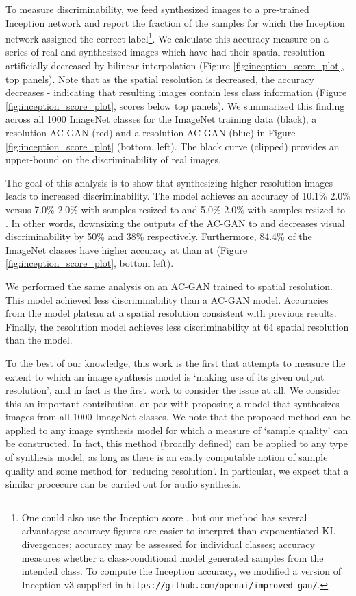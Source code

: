 \documentclass{article}
\begin{document}
To measure discriminability, we feed synthesized images to a pre-trained Inception network \citep{szegedy2015rethinking} and
report the fraction of the samples for which the Inception network assigned the correct
label\footnote{
  One could also use the Inception score \citep{IMPROVEDTECHNIQUES},
  but our method has several advantages:
  accuracy figures are easier to interpret than exponentiated KL-divergences;
  accuracy may be assessed for individual classes; accuracy measures whether
  a class-conditional model generated samples from the intended class.
  To compute the Inception accuracy, we modified a version of Inception-v3
  supplied in \texttt{https://github.com/openai/improved-gan/}.
}.
We calculate this accuracy measure on a series of real
and synthesized images which have had their spatial resolution artificially decreased by
bilinear interpolation 
(Figure \ref{fig:inception_score_plot}, top panels).
Note that as the spatial resolution is 
decreased, the accuracy decreases - indicating that resulting images contain less
class information (Figure \ref{fig:inception_score_plot}, scores below top panels).
We summarized this finding across all 1000 ImageNet classes for the ImageNet training
data (black),
a  resolution AC-GAN (red) and a  resolution AC-GAN (blue) in Figure \ref{fig:inception_score_plot} (bottom, left).
The black curve (clipped) provides an upper-bound on the discriminability of real images.

The goal of this analysis is to
show that synthesizing higher resolution images leads to increased discriminability.
The  model achieves an accuracy of
10.1\%  2.0\% versus
7.0\%  2.0\% with samples resized to 
and
5.0\%  2.0\% with samples resized to .
In other words, downsizing the outputs of the AC-GAN to  and  decreases
visual discriminability by 50\% and 38\% respectively.
Furthermore, 84.4\% of the ImageNet classes have higher accuracy at
 than at  (Figure
\ref{fig:inception_score_plot}, bottom left).

We performed the same analysis on an AC-GAN trained to  spatial resolution.
This model achieved
less discriminability than a  AC-GAN model.
Accuracies from the  model plateau at
a  spatial resolution consistent with previous results.
Finally, the  resolution model achieves less
discriminability at 64 spatial resolution than the  model.

To the best of our knowledge, this work is the first that attempts to measure
the extent to which an image synthesis model is `making use of its given output resolution',
and in fact is the first work to consider the issue at all.
We consider this an important contribution,
on par with proposing a model that synthesizes images from all 1000 ImageNet classes.
We note that the proposed method can be applied to any image synthesis model for which
a measure of `sample quality' can be constructed.
In fact, this method (broadly defined) can be applied to any type of synthesis model,
as long as there is an easily computable notion of sample quality and some
method for `reducing resolution'.  
In particular, we expect that a similar procecure can be carried out for audio synthesis.
\end{document}
